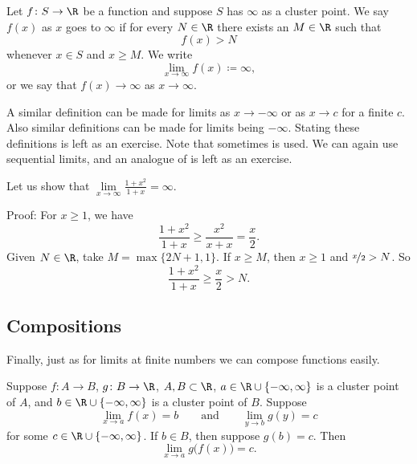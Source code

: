 \begin{defn}
%
Let $f \colon S \to \R$ be a function and suppose 
$S$ has $\infty$ as a cluster point.
We say $f(x)$
\emph{} 
as $x$ goes to $\infty$
if for every $N \in \R$
there exists an $M \in \R$ such that
\begin{equation*}
f(x) > N
\end{equation*}
whenever $x \in S$ and $x \geq M$.
We write
\begin{equation*}
\lim_{x \to \infty} f(x) \coloneqq \infty ,
\end{equation*}
or we say that $f(x) \to \infty$ as $x \to \infty$.
\end{defn}

A similar definition can be made for limits as $x \to -\infty$
or as $x \to c$ for a finite $c$.  Also similar definitions can be
made for limits being $-\infty$.  Stating these definitions is left
as an exercise.
Note that
sometimes \emph{} is used.
We can again use sequential limits, and an analogue of 
 is left as an exercise.

\begin{example}
Let us show that $\lim\limits_{x \to \infty} \frac{1+x^2}{1+x} = \infty$.

Proof: For $x \geq 1$, we have
\begin{equation*}
\frac{1+x^2}{1+x} \geq 
\frac{x^2}{x+x}  = 
\frac{x}{2} .
\end{equation*}
Given $N \in \R$, take $M = \max \{ 2N+1 , 1 \}$.
If $x \geq M$, then $x \geq 1$ and $\nicefrac{x}{2} > N$.
So
\begin{equation*}
\frac{1+x^2}{1+x} \geq 
\frac{x}{2} > N .
\end{equation*}
\end{example}

\subsection{Compositions}

Finally, just as for limits at finite numbers we can compose functions
easily.

\begin{prop} \label{prop:inflimcompositions}
Suppose $f \colon A \to B$, $g \colon B \to \R$, $A, B \subset \R$, 
$a \in \R \cup \{ -\infty, \infty\}$ is a cluster point of $A$,
and $b \in \R \cup \{ -\infty, \infty\}$ is a cluster point of $B$.
Suppose 
\begin{equation*}
\lim_{x \to a} f(x) = b\qquad \text{and} \qquad \lim_{y \to b} g(y) = c
\end{equation*}
for some $c \in \R \cup \{ -\infty, \infty \}$.
If $b \in B$, then suppose $g(b) = c$.
Then
\begin{equation*}
\lim_{x \to a} g\bigl(f(x)\bigr) = c .
\end{equation*}
\end{prop}

